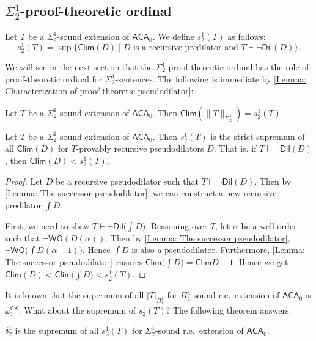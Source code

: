 \documentclass{mhkr}
\newcommand{\added}[1]{#1}
\newcommand{\WO}{\mathsf{WO}}
\newcommand{\Clim}{\mathsf{Clim}}
\newcommand{\Dil}{\mathsf{Dil}}
\newcommand{\CK}{\mathsf{CK}}
\newcommand{\ACA}{\mathsf{ACA}}
\begin{document}
\subsection{\texorpdfstring{$\Sigma^1_2$}{Sigma 1 2}-proof-theoretic ordinal}
\begin{definition} \label{Definition: s12 ordinal}
    Let $T$ be a $\Sigma^1_2$-sound extension of $\ACA_0$. We define $s^1_2(T)$ as follows:
    \begin{equation*}
        s^1_2(T) = \sup\{\Clim(D) \mid \text{$D$ is a recursive predilator and }T\vdash \lnot\Dil(D)\}.
    \end{equation*}
\end{definition}
\added{We will see in the next section that the $\Sigma^1_2$-proof-theoretic ordinal has the role of proof-theoretic ordinal for $\Sigma^1_2$-sentences.}
The following is immediate by \autoref{Lemma: Characterization of proof-theoretic pseudodilator}:
\begin{lemma} \pushQED{\qed}
    Let $T$ be a $\Sigma^1_2$-sound extension of $\ACA_0$. Then $\Clim(\|T\|_{\Sigma^1_2}) = s^1_2(T)$. \qedhere 
\end{lemma}

\begin{lemma} \label{Lemma: s 1 2 is the strict supremum}
    Let $T$ be a $\Sigma^1_2$-sound extension of $\ACA_0$.
    Then $s^1_2(T)$ is the strict supremum of all $\Clim(D)$ for $T$-provably recursive pseudodilators $D$. That is, if $T\vdash \lnot\Dil(D)$, then $\Clim(D)<s^1_2(T)$.
\end{lemma}
\begin{proof}
    Let $D$ be a recursive pseudodilator such that $T\vdash \lnot\Dil(D)$.
    Then by \autoref{Lemma: The successor pseudodilator}, we can construct a new recursive predilator $\int D$. 
    
    First, we need to show $T\vdash \lnot\Dil\bigl(\int D\bigr)$.
    Reasoning over $T$, let $\alpha$ be a well-order such that $\lnot\WO(D(\alpha))$. Then by \autoref{Lemma: The successor pseudodilator}, $\lnot\WO\bigl(\int D(\alpha+1)\bigr)$. Hence $\int D$ is also a pseudodilator.
    Furthermore, \autoref{Lemma: The successor pseudodilator} ensures $\Clim\bigl(\int D\bigr) = \Clim D + 1$. Hence we get $\Clim(D) < \Clim\bigl(\int D\bigr) < s^1_2(T)$.
\end{proof}

It is known that the supermum of all $|T|_{\Pi^1_1}$ for $\Pi^1_1$-sound r.e.\ extension of $\ACA_0$ is $\omega_1^\CK$. What about the supremum of $s^1_2(T)$? The following theorem \added{answers}: 
\begin{theorem} \pushQED{\qed}
    $\delta^1_2$ is the supremum of all $s^1_2(T)$ for $\Sigma^1_2$-sound r.e.\ extension of $\ACA_0$. \qedhere 
\end{theorem}
\end{document}
